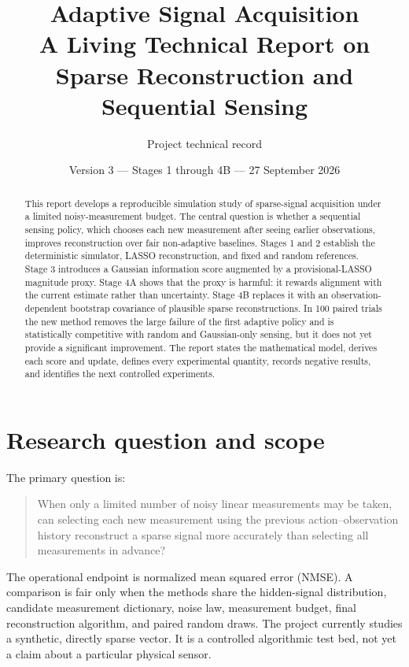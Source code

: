 \documentclass[11pt,a4paper]{article}
\title{\textbf{Adaptive Signal Acquisition}\\[0.4em]
\large A Living Technical Report on Sparse Reconstruction and Sequential Sensing}
\author{Project technical record}
\date{Version 3 --- Stages 1 through 4B --- 27 September 2026}
\begin{document}
\maketitle

\begin{abstract}
This report develops a reproducible simulation study of sparse-signal acquisition under a
limited noisy-measurement budget.  The central question is whether a sequential sensing
policy, which chooses each new measurement after seeing earlier observations, improves
reconstruction over fair non-adaptive baselines.  Stages 1 and 2 establish the deterministic
simulator, LASSO reconstruction, and fixed and random references.  Stage 3 introduces a
Gaussian information score augmented by a provisional-LASSO magnitude proxy.  Stage 4A
shows that the proxy is harmful: it rewards alignment with the current estimate rather than
uncertainty.  Stage 4B replaces it with an observation-dependent bootstrap covariance of
plausible sparse reconstructions.  In 100 paired trials the new method removes the large
failure of the first adaptive policy and is statistically competitive with random and
Gaussian-only sensing, but it does not yet provide a significant improvement.  The report
states the mathematical model, derives each score and update, defines every experimental
quantity, records negative results, and identifies the next controlled experiments.
\end{abstract}

\tableofcontents
\newpage

\section{Research question and scope}

The primary question is:

\begin{quote}
When only a limited number of noisy linear measurements may be taken, can selecting each
new measurement using the previous action--observation history reconstruct a sparse signal
more accurately than selecting all measurements in advance?
\end{quote}

The operational endpoint is normalized mean squared error (NMSE).  A comparison is fair
only when the methods share the hidden-signal distribution, candidate measurement
dictionary, noise law, measurement budget, final reconstruction algorithm, and paired
random draws.  The project currently studies a synthetic, directly sparse vector.  It is a
controlled algorithmic test bed, not yet a claim about a particular physical sensor.
\end{document}

